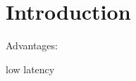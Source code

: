 
\section{Introduction}

Advantages:

low latency

\cite{boerlin09getting}\cite{lichtsteiner08asynchronous}\cite{etienne-cummings99intelligent}\cite{oster08quantification}
